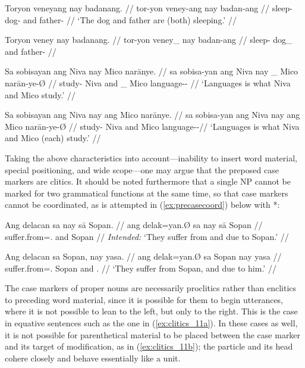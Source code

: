 \pex\label{ex:clitics_7}
\a\label{ex:clitics_7a}\begingl
	\gla Toryon veneyang nay badanang. //
	\glb tor-yon veney-ang nay badan-ang //
	\glc sleep-\TplN{} dog-\Aarg{} and father-\Aarg{} //
	\glft `The dog and father are (both) sleeping.' //
\endgl

\a\label{ex:clitics_7b}\ljudge{*}\begingl
	\gla Toryon veney nay badanang. //
	\glb tor-yon veney\_ nay badan-ang //
	\glc sleep-\TplN{} dog\_ and father-\Aarg{} //
\endgl

\a\label{ex:clitics_7c}\begingl
	\gla Sa sobisayan ang Niva nay {} Mico narānye. //
	\glb sa sobisa-yan ang Niva nay \_ Mico narān-ye-Ø //
	\glc \PatT{} study-\TplM{} \Aarg{} Niva and \_ Mico 
		language-\Pl{}-\Top{} //
	\glft `Languages is what Niva and Mico study.' //
\endgl

\a\label{ex:clitics_7d}\begingl
	\gla Sa sobisayan ang Niva nay ang Mico narānye. //
	\glb sa sobisa-yan ang Niva nay ang Mico narān-ye-Ø //
	\glc \PatT{} study-\TplM{} \Aarg{} Niva and \Aarg{} Mico 
		language-\Pl{}-\Top{}//
	\glft `Languages is what Niva and Mico (each) study.' //
\endgl
\xe


Taking the above characteristics into account---inability to insert word
material, special positioning, and wide scope---one may argue that the preposed
case markers are clitics. It should be noted furthermore that a single NP
cannot be marked for two grammatical functions at the same time, so that case
markers cannot be coordinated, as is attempted in (\ref{ex:precasecoord}) below
with *:

\pex
\a\label{ex:precasecoord}\ljudge*\begingl
	\gla Ang delacan sa nay sā Sopan. //
	\glb ang delak=yan.Ø sa nay sā Sopan //
	\glc \AgtT{} suffer.from=\TplM{}.\Top{} \Parg{} and \Caus{} Sopan //
	\glft \textit{Intended:} `They suffer from and due to Sopan.' //
\endgl

\a\begingl
	\gla Ang delacan sa Sopan, nay yasa. //
	\glb ang delak=yan.Ø sa Sopan nay yasa //
	\glc \AgtT{} suffer.from=\TplM{}.\Top{} \Parg{} Sopan and \TsgM{}.\Caus{} //
	\glft `They suffer from Sopan, and due to him.' //
	\endgl
\xe

The case markers of proper nouns are necessarily proclitics rather than
enclitics to preceding word material, since it is possible for them to begin
utterances, where it is not possible to lean to the left, but only to the 
right. This is the case in equative sentences such as the one in 
(\ref{ex:clitics_11a}). In these cases as well, it is not possible for
parenthetical material to be placed between the case marker and its target of
modification, as in (\ref{ex:clitics_11b}); the particle and its head cohere
closely and behave essentially like a unit.

